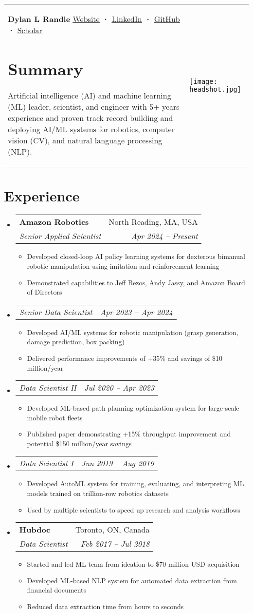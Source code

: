 \documentclass[a4paper,11pt]{article}
\makeatletter
\newcommand{\resumeItem}[1]{
  \item\small{#1}
}
\newcommand{\resumeItemListStart}{\begin{itemize}[rightmargin=0.11in]}
\newcommand{\resumeItemListEnd}{\end{itemize}}
\newcommand{\resumeQuadHeading}[4]{
  \item
  \begin{tabular*}{0.96\textwidth}[t]{l@{\extracolsep{\fill}}r}
    \textbf{#1} & #2 \\
    \textit{\small#3} & \textit{\small #4} \\
  \end{tabular*}
}
\newcommand{\resumeQuadHeadingChild}[2]{
  \item
  \begin{tabular*}{0.96\textwidth}[t]{l@{\extracolsep{\fill}}r}
    \textit{\small#1} & \textit{\small#2} \\
  \end{tabular*}
}
\newcommand{\resumeHeadingListStart}{
  \begin{itemize}[leftmargin=0.15in, label={}]
}
\newcommand{\resumeHeadingListEnd}{\end{itemize}}
\makeatother
\begin{document}
\begin{tabularx}{\linewidth}{@{}m{} m{}@{}}
{
    \textbf{\Huge Dylan L Randle \vspace{2pt}} \newline
    \href{https://dylanrandle.github.io/}{\uline{Website}} \textbf{·}
    \href{https://linkedin.com/in/dylanrandle}{\uline{LinkedIn}} \textbf{·}
    \href{https://github.com/dylanrandle}{\uline{GitHub}} \textbf{·}
    \href{https://scholar.google.com/citations?user=62z1l9cAAAAJ}{\uline{Scholar}}
    \section{Summary}
    \small{
      Artificial intelligence (AI) and machine learning (ML) leader, scientist, and engineer with 5+ years experience and proven track record building and deploying AI/ML systems for robotics, computer vision (CV), and natural language processing (NLP).
    }
} & 
{
    \hfill
    \texttt{[image: headshot.jpg]}
}
\end{tabularx}


\section{Experience}
\resumeHeadingListStart{}
  \resumeQuadHeading{Amazon Robotics}{North Reading, MA, USA}{Senior Applied Scientist}{Apr 2024 -- Present}
    \resumeItemListStart
      \resumeItem{Developed closed-loop AI policy learning systems for dexterous bimanual robotic manipulation using imitation and reinforcement learning}
      \resumeItem{Demonstrated capabilities to Jeff Bezos, Andy Jassy, and Amazon Board of Directors}
    \resumeItemListEnd
  \resumeQuadHeadingChild{Senior Data Scientist}{Apr 2023 -- Apr 2024}
    \resumeItemListStart
      \resumeItem{Developed AI/ML systems for robotic manipulation (grasp generation, damage prediction, box packing)}
      \resumeItem{Delivered performance improvements of +35\% and savings of \$10 million/year}
    \resumeItemListEnd
  \resumeQuadHeadingChild{Data Scientist II}{Jul 2020 -- Apr 2023}
    \resumeItemListStart
      \resumeItem{Developed ML-based path planning optimization system for large-scale mobile robot fleets}
      \resumeItem{Published paper demonstrating +15\% throughput improvement and potential \$150 million/year savings}
    \resumeItemListEnd
  \resumeQuadHeadingChild{Data Scientist I}{Jun 2019 -- Aug 2019}
    \resumeItemListStart
      \resumeItem{Developed AutoML system for training, evaluating, and interpreting ML models trained on trillion-row robotics datasets}
      \resumeItem{Used by multiple scientists to speed up research and analysis workflows}
    \resumeItemListEnd
  \resumeQuadHeading{Hubdoc}{Toronto, ON, Canada}
  {Data Scientist}{Feb 2017 -- Jul 2018}
    \resumeItemListStart{}
        \resumeItem{Started and led ML team from ideation to \$70 million USD acquisition}
        \resumeItem{Developed ML-based NLP system for automated data extraction from financial documents}
        \resumeItem{Reduced data extraction time from hours to seconds}
    \resumeItemListEnd{}
\resumeHeadingListEnd{}
\end{document}
